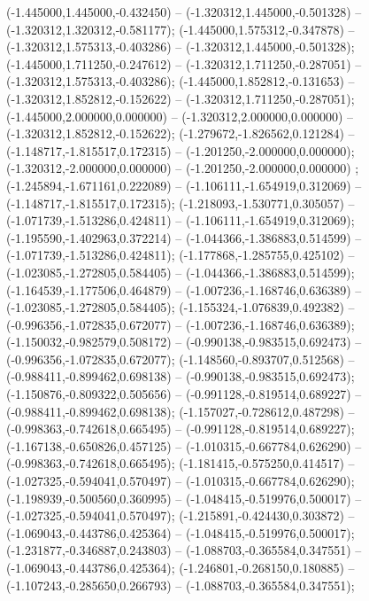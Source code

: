  (-1.445000,1.445000,-0.432450) -- (-1.320312,1.445000,-0.501328) -- (-1.320312,1.320312,-0.581177);
 (-1.445000,1.575312,-0.347878) -- (-1.320312,1.575313,-0.403286) -- (-1.320312,1.445000,-0.501328);
 (-1.445000,1.711250,-0.247612) -- (-1.320312,1.711250,-0.287051) -- (-1.320312,1.575313,-0.403286);
 (-1.445000,1.852812,-0.131653) -- (-1.320312,1.852812,-0.152622) -- (-1.320312,1.711250,-0.287051);
 (-1.445000,2.000000,0.000000) -- (-1.320312,2.000000,0.000000) -- (-1.320312,1.852812,-0.152622);
 (-1.279672,-1.826562,0.121284) -- (-1.148717,-1.815517,0.172315) -- (-1.201250,-2.000000,0.000000);
 (-1.320312,-2.000000,0.000000) -- (-1.201250,-2.000000,0.000000) ;
 (-1.245894,-1.671161,0.222089) -- (-1.106111,-1.654919,0.312069) -- (-1.148717,-1.815517,0.172315);
 (-1.218093,-1.530771,0.305057) -- (-1.071739,-1.513286,0.424811) -- (-1.106111,-1.654919,0.312069);
 (-1.195590,-1.402963,0.372214) -- (-1.044366,-1.386883,0.514599) -- (-1.071739,-1.513286,0.424811);
 (-1.177868,-1.285755,0.425102) -- (-1.023085,-1.272805,0.584405) -- (-1.044366,-1.386883,0.514599);
 (-1.164539,-1.177506,0.464879) -- (-1.007236,-1.168746,0.636389) -- (-1.023085,-1.272805,0.584405);
 (-1.155324,-1.076839,0.492382) -- (-0.996356,-1.072835,0.672077) -- (-1.007236,-1.168746,0.636389);
 (-1.150032,-0.982579,0.508172) -- (-0.990138,-0.983515,0.692473) -- (-0.996356,-1.072835,0.672077);
 (-1.148560,-0.893707,0.512568) -- (-0.988411,-0.899462,0.698138) -- (-0.990138,-0.983515,0.692473);
 (-1.150876,-0.809322,0.505656) -- (-0.991128,-0.819514,0.689227) -- (-0.988411,-0.899462,0.698138);
 (-1.157027,-0.728612,0.487298) -- (-0.998363,-0.742618,0.665495) -- (-0.991128,-0.819514,0.689227);
 (-1.167138,-0.650826,0.457125) -- (-1.010315,-0.667784,0.626290) -- (-0.998363,-0.742618,0.665495);
 (-1.181415,-0.575250,0.414517) -- (-1.027325,-0.594041,0.570497) -- (-1.010315,-0.667784,0.626290);
 (-1.198939,-0.500560,0.360995) -- (-1.048415,-0.519976,0.500017) -- (-1.027325,-0.594041,0.570497);
 (-1.215891,-0.424430,0.303872) -- (-1.069043,-0.443786,0.425364) -- (-1.048415,-0.519976,0.500017);
 (-1.231877,-0.346887,0.243803) -- (-1.088703,-0.365584,0.347551) -- (-1.069043,-0.443786,0.425364);
 (-1.246801,-0.268150,0.180885) -- (-1.107243,-0.285650,0.266793) -- (-1.088703,-0.365584,0.347551);
